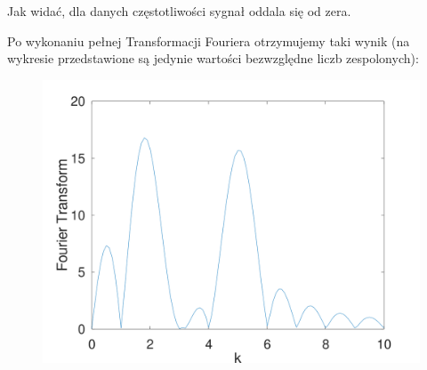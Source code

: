 \documentclass{article}
\begin{document}
\newpage

Jak widać, dla danych częstotliwości sygnał oddala się od zera.

Po wykonaniu pełnej Transformacji Fouriera otrzymujemy taki wynik (na wykresie przedstawione są jedynie wartości bezwzględne liczb zespolonych):

\begin{figure}
\includegraphics[width=1\linewidth]{fourier9.png}
\caption{}
\end{figure}
\end{document}
